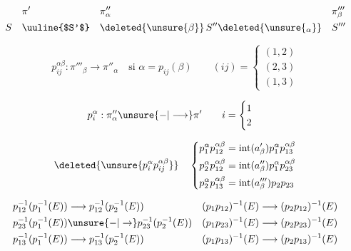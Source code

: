 \[
\begin{aligned}
  &\pi' &&\pi''_\alpha &&\pi'''_\beta\\
S\quad &\text{\uuline{$S'$}} &&\deleted{\unsure{\beta}}\, S''\deleted{\unsure{{}_{\alpha}}} &&S'''
\end{aligned}
\]

\[
p_{ij}^{\alpha\beta}:\pi'''_\beta\longrightarrow\pi''_\alpha
\quad\text{si }\alpha=p_{ij}(\beta)\qquad
(ij)=\begin{cases}(1,2)\\(2,3)\\(1,3)\end{cases}
\]

\[
p_i^\alpha:\pi''_\alpha\unsure{-|\longrightarrow}\pi'\qquad
i=\begin{cases}1\\2\end{cases}
\]

\[
\deleted{\unsure{p_i^\alpha p_{ij}^{\alpha\beta}}}\quad
\left\{\begin{aligned}
 p_1^\alpha p_{12}^{\alpha\beta}&=\operatorname{int}(a'_\beta)p_1^\alpha p_{13}^{\alpha\beta}\\
 p_2^\alpha p_{12}^{\alpha\beta}&=\operatorname{int}(a''_\beta)p_1^\alpha p_{23}^{\alpha\beta}\\
 p_2^\alpha p_{13}^{\alpha\beta}&=\operatorname{int}(a'''_\beta)p_2 p_{23}
\end{aligned}\right.
\]

\[
\begin{aligned}
p_{12}^{-1}(p_1^{-1}(E))&\longrightarrow p_{12}^{-1}(p_2^{-1}(E))&
(p_1p_{12})^{-1}(E)&\longrightarrow(p_2p_{12})^{-1}(E)\\
p_{23}^{-1}(p_1^{-1}(E))&\unsure{-|\to}p_{23}^{-1}(p_2^{-1}(E))&
(p_1p_{23})^{-1}(E)&\longrightarrow(p_2p_{23})^{-1}(E)\\
p_{13}^{-1}(p_1^{-1}(E))&\longrightarrow p_{13}^{-1}(p_2^{-1}(E))&
(p_1p_{13})^{-1}(E)&\longrightarrow(p_2p_{13})^{-1}(E)
\end{aligned}
\]


